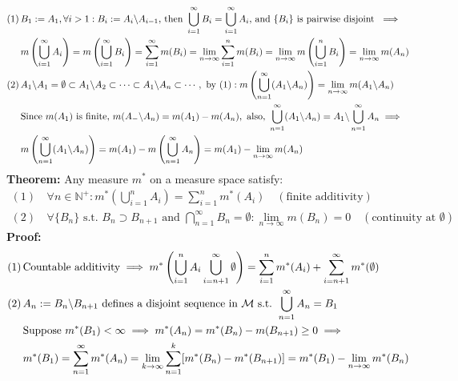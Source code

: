 \documentclass{article}
\newcommand{\N}{\mathbb{N}}
\newcommand{\sumiinf}{\sum\limits_{i=1}^\infty}
\newcommand{\sumninf}{\sum\limits_{n=1}^\infty}
\newcommand{\capninf}{\bigcap\limits_{n=1}^\infty}
\newcommand{\infcup}{\bigcup\limits_{n=1}^\infty}
\newcommand{\cupiinf}{\bigcup\limits_{i=1}^\infty}
\newcommand{\cupninf}{\bigcup\limits_{n=1}^\infty}
\newcommand{\sumin}{\sum\limits_{i=1}^n}
\newcommand{\cupin}{\bigcup\limits_{i=1}^n}
\newcommand{\bcsl}{\symbol{92}}
\newcommand{\limninf}{\lim\limits_{n\to\infty}}
\newcommand{\limkinf}{\lim\limits_{k\to\infty}}
\newcommand{\st}{\mbox{ s.t. }}
\newcommand{\0}{{\bf{0}}}
\newcommand{\1}{{\bf{1}}}
\begin{document}
\begin{equation}
\begin{split}
    (1)\,&B_1:=A_1,\forall i>1:B_i:=A_i\symbol{92}A_{i-1}\mbox{, then }\bigcup_{i=1}^\infty B_i=\bigcup_{i=1}^\infty A_i\mbox{, and }\{B_i\}\mbox{ is pairwise disjoint }\implies\\
    &m\left(\cupiinf A_i\right)=m\left(\cupiinf B_i\right)=\sumiinf m(B_i)=\limninf\sumin m(B_i)=\limninf m\left(\cupin B_i\right)=\limninf m(A_n)\\
    (2)\,&A_1\bcsl A_1=\emptyset\subset A_1\bcsl A_2\subset\dots\subset A_1\bcsl A_n\subset\cdots,\mbox{ by (1)}:m\left(\cupninf(A_1\bcsl A_n)\right)=\limninf m(A_1\bcsl A_n)\\
    &\mbox{Since }m(A_1)\mbox{ is finite, }m(A_-\bcsl A_n)=m(A_1)-m(A_n),\mbox{ also, }\cupninf(A_1\bcsl A_n)=A_1\bcsl\cupninf A_n\implies\\
    &m\left(\infcup (A_1\bcsl A_n)\right)=m(A_1)-m\left(\infcup A_n\right)=m(A_1)-\limninf m(A_n)
\end{split}
\end{equation}
\textbf{Theorem:} Any measure $m^*$ on a measure space satisfy:
\begin{equation}
\begin{split}
    (1)\,&\forall n\in\N^+:m^*\left(\cupin A_i\right)=\sumin m^*(A_i)\quad(\mbox{finite additivity})\\
    (2)\,&\forall\{B_n\}\st B_n\supset B_{n+1}\mbox{ and }\capninf B_n=\emptyset:\limninf m(B_n)=0\quad(\mbox{continuity at }\emptyset)
\end{split}
\end{equation}
\textbf{Proof:}
\begin{equation}
\begin{split}
    (1)\,&\mbox{Countable additivity}\implies m^*\left(\cupin A_i\bigcup_{i=n+1}^\infty\emptyset\right)=\sumin m^*(A_i)+\sum_{i=n+1}^\infty m^*(\emptyset)\\
    (2)\,&A_n:=B_n\bcsl B_{n+1}\mbox{ defines a disjoint sequence in }\mathcal{M}\st\cupninf A_n=B_1\\
    &\mbox{Suppose }m^*(B_1)<\infty\implies m^*(A_n)=m^*(B_n)-m(B_{n+1})\geq0\implies\\
    &m^*(B_1)=\sumninf m^*(A_n)=\limkinf\sum_{n=1}^k[m^*(B_n)-m^*(B_{n+1})]=m^*(B_1)-\limninf m^*(B_n)
\end{split}
\end{equation}
\end{document}
